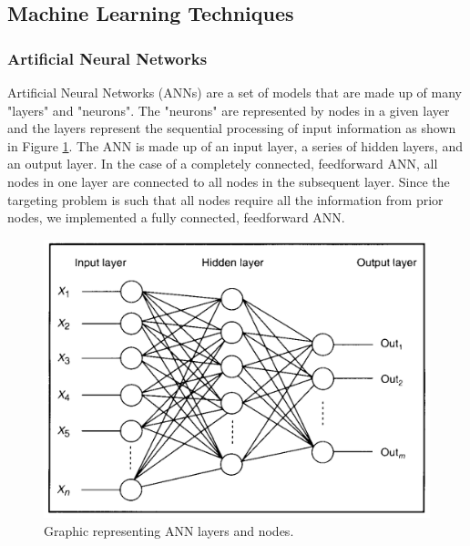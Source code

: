 \documentclass[11pt,letterpaper]{article}
\begin{document}
\subsection{Machine Learning Techniques}
\subsubsection{Artificial Neural Networks}
Artificial Neural Networks (ANNs) are a set of models that are made up of many "layers" and "neurons". The "neurons" are represented by nodes in a given layer and the layers represent the sequential processing of input information as shown in Figure \ref{fig:NN}. The ANN is made up of an input layer, a series of hidden layers, and an output layer. In the case of a completely connected, feedforward ANN, all nodes in one layer are connected to all nodes in the subsequent layer. Since the targeting problem is such that all nodes require all the information from prior nodes, we implemented a fully connected, feedforward ANN.
\begin{figure}[h]
	\centering
	\includegraphics[scale = 0.8]{NN.png}
	\caption{Graphic representing ANN layers and nodes. }
	\label{fig:NN}
\end{figure}\\
\end{document}
